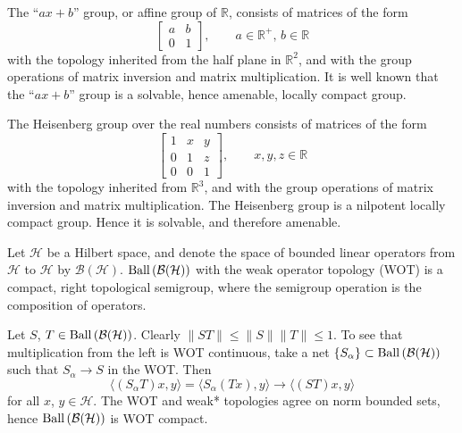 \begin{example}
The ``$ax+b$'' group, or affine group of $\mathbb{R}$, consists of matrices of the form
\[  \left[ \begin{array}{cc}
                  a & b \\
                  0 & 1
                  \end{array}
          \right],\qquad a\in\mathbb{R}^+,\,b\in\mathbb{R}
\]
with the topology inherited from the half plane in $\mathbb{R}^2$, and with the group operations of 
matrix inversion and matrix multiplication.
It is well known that the ``$ax+b$'' group is a solvable, hence amenable, locally compact group.
\end{example}

\begin{example}
The Heisenberg group over the real numbers consists of matrices of the form
\[ \left[ \begin{array}{ccc}
           1 & x & y \\
           0 & 1 & z \\
           0 & 0 & 1
          \end{array}
   \right],\qquad x,y,z\in\mathbb{R}
\]
with the topology inherited from $\mathbb{R}^3$, and with the group operations of 
matrix inversion and matrix multiplication.
The Heisenberg group is a nilpotent locally compact group.  Hence it is solvable, and therefore amenable.
\end{example}

\begin{example}
Let $\mathcal{H}$ be a Hilbert space, and denote the space of bounded linear operators from
$\mathcal{H}$ to $\mathcal{H}$ by $\mathcal{B}(\mathcal{H})$.
$\operatorname{Ball\,}(\mathcal{B}(\mathcal{H}))$  with the weak operator topology (WOT) is
a compact, right topological semigroup, where the semigroup operation is the composition
of operators.

Let $S$, $T \in \operatorname{Ball\,}(\mathcal{B}(\mathcal{H}))$.  Clearly $\|ST\| \leq \|S\|\|T\| \leq 1$.
To see that multiplication from the left is WOT continuous, take a net
$\{S_\alpha\} \subset \operatorname{Ball\,}(\mathcal{B}(\mathcal{H}))$ such that $S_\alpha \rightarrow S$ in the WOT.
Then
\[
\langle (S_\alpha T)x, y\rangle = \langle S_\alpha(Tx), y\rangle \rightarrow \langle (ST)x, y\rangle
\]
for all $x$, $y\in\mathcal{H}$.  The WOT and weak* topologies agree on norm bounded sets,
hence $\operatorname{Ball\,}(\mathcal{B}(\mathcal{H}))$ is WOT compact.
\end{example}